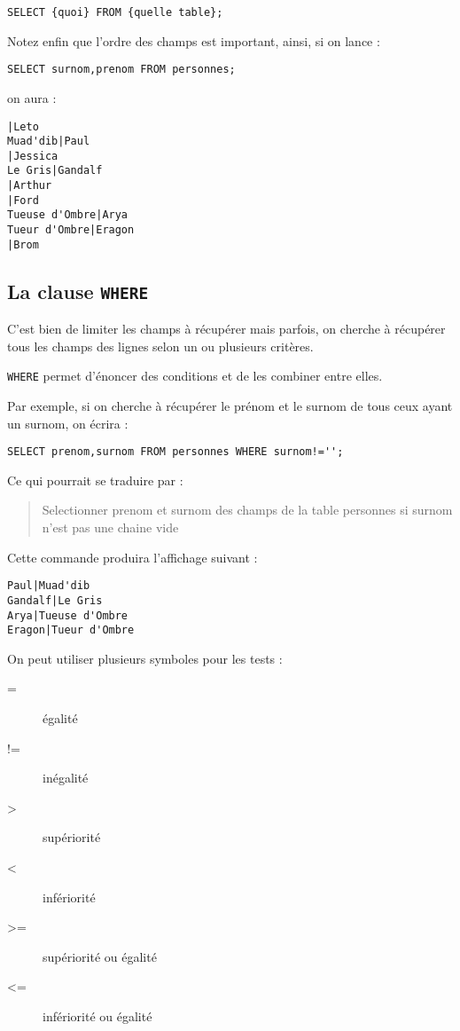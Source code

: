 \documentclass[a4paper, 11pt]{report}
\begin{document}
\begin{verbatim}
SELECT {quoi} FROM {quelle table};
\end{verbatim}

Notez enfin que l'ordre des champs est important, ainsi, si on lance :

\begin{verbatim}
SELECT surnom,prenom FROM personnes;
\end{verbatim}

on aura :

\begin{verbatim}
|Leto
Muad'dib|Paul
|Jessica
Le Gris|Gandalf
|Arthur
|Ford
Tueuse d'Ombre|Arya
Tueur d'Ombre|Eragon
|Brom
\end{verbatim}

\subsection{La clause \texttt{WHERE}}

C'est bien de limiter les champs à récupérer mais parfois, on cherche à récupérer tous les champs des lignes selon un ou plusieurs critères.

\texttt{WHERE} permet d'énoncer des conditions et de les combiner entre elles.

Par exemple, si on cherche à récupérer le prénom et le surnom de tous ceux ayant un surnom, on écrira :

\begin{verbatim}
SELECT prenom,surnom FROM personnes WHERE surnom!='';
\end{verbatim}

Ce qui pourrait se traduire par :
\begin{quote}
Selectionner prenom et surnom des champs de la table personnes si surnom n'est pas une chaine vide
\end{quote}

Cette commande produira l'affichage suivant :
\begin{verbatim}
Paul|Muad'dib
Gandalf|Le Gris
Arya|Tueuse d'Ombre
Eragon|Tueur d'Ombre
\end{verbatim}

On peut utiliser plusieurs symboles pour les tests :

\begin{description}
    \item[=] égalité
    \item[!=] inégalité
    \item[>] supériorité
    \item[<] infériorité
    \item[>=] supériorité ou égalité
    \item[<=] infériorité ou égalité
\end{description}
\end{document}
